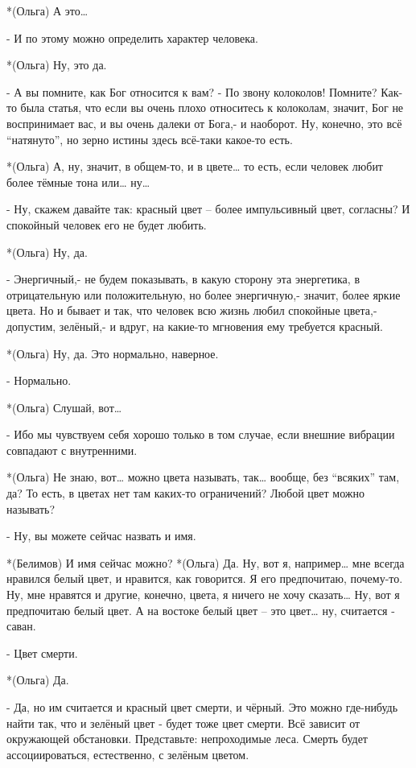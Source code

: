 *(Ольга) А это…

- И по этому можно определить характер человека.

*(Ольга) Ну, это да.

- А вы помните, как Бог относится к вам? - По звону колоколов! Помните? Как-то была статья, что если вы очень плохо относитесь к колоколам, значит, Бог не воспринимает вас, и вы очень далеки от Бога,-  и наоборот. Ну, конечно, это всё “натянуто”, но зерно истины здесь всё-таки  какое-то есть.

*(Ольга) А, ну, значит, в общем-то, и в цвете… то есть, если человек любит более тёмные тона или… ну…

- Ну, скажем давайте так: красный цвет – более импульсивный цвет, согласны? И спокойный человек его не будет любить.

*(Ольга) Ну, да.

- Энергичный,- не будем показывать, в какую сторону эта энергетика, в отрицательную или положительную, но более энергичную,- значит, более яркие цвета. Но и бывает и так, что человек всю жизнь любил спокойные цвета,- допустим, зелёный,- и вдруг, на какие-то мгновения ему требуется красный.

*(Ольга) Ну, да. Это нормально, наверное.

- Нормально.

*(Ольга) Слушай, вот…

- Ибо мы чувствуем себя хорошо только в том случае, если внешние вибрации совпадают с внутренними.

*(Ольга) Не знаю, вот… можно цвета называть, так… вообще, без “всяких” там, да? То есть, в цветах нет там каких-то ограничений? Любой цвет можно называть?

- Ну, вы можете сейчас назвать и имя.

*(Белимов) И имя сейчас можно?
*(Ольга) Да. Ну, вот я, например… мне всегда нравился белый цвет, и нравится, как говорится. Я его предпочитаю, почему-то. Ну, мне нравятся и другие, конечно, цвета, я ничего не хочу сказать… Ну, вот я предпочитаю белый цвет. А на востоке белый цвет – это цвет… ну, считается - саван.

- Цвет смерти.

*(Ольга) Да.

- Да, но им считается и красный цвет смерти, и чёрный. Это можно где-нибудь найти так, что и зелёный цвет - будет тоже цвет смерти. Всё зависит от окружающей обстановки. Представьте: непроходимые леса. Смерть будет ассоциироваться, естественно, с зелёным цветом.

